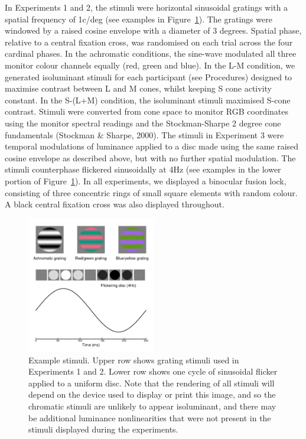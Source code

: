 \documentclass[
  letterpaper,
  DIV=11,
  numbers=noendperiod]{scrartcl}
\begin{document}
In Experiments 1 and 2, the stimuli were horizontal sinusoidal gratings
with a spatial frequency of 1c/deg (see examples in
Figure~\ref{fig-examplestim}). The gratings were windowed by a raised
cosine envelope with a diameter of 3 degrees. Spatial phase, relative to
a central fixation cross, was randomised on each trial across the four
cardinal phases. In the achromatic conditions, the sine-wave modulated
all three monitor colour channels equally (red, green and blue). In the
L-M condition, we generated isoluminant stimuli for each participant
(see Procedures) designed to maximise contrast between L and M cones,
whilst keeping S cone activity constant. In the S-(L+M) condition, the
isoluminant stimuli maximised S-cone contrast. Stimuli were converted
from cone space to monitor RGB coordinates using the monitor spectral
readings and the Stockman-Sharpe 2 degree cone fundamentals (Stockman \&
Sharpe, 2000). The stimuli in Experiment 3 were temporal modulations of
luminance applied to a disc made using the same raised cosine envelope
as described above, but with no further spatial modulation. The stimuli
counterphase flickered sinusoidally at 4Hz (see examples in the lower
portion of Figure~\ref{fig-examplestim}). In all experiments, we
displayed a binocular fusion lock, consisting of three concentric rings
of small square elements with random colour. A black central fixation
cross was also displayed throughout.

\begin{figure}

{\centering \includegraphics[width=0.5\textwidth,height=\textheight]{Figures/examplestim.pdf}

}

\caption{\label{fig-examplestim}Example stimuli. Upper row shows grating
stimuli used in Experiments 1 and 2. Lower row shows one cycle of
sinusoidal flicker applied to a uniform disc. Note that the rendering of
all stimuli will depend on the device used to display or print this
image, and so the chromatic stimuli are unlikely to appear isoluminant,
and there may be additional luminance nonlinearities that were not
present in the stimuli displayed during the experiments.}

\end{figure}
\end{document}
